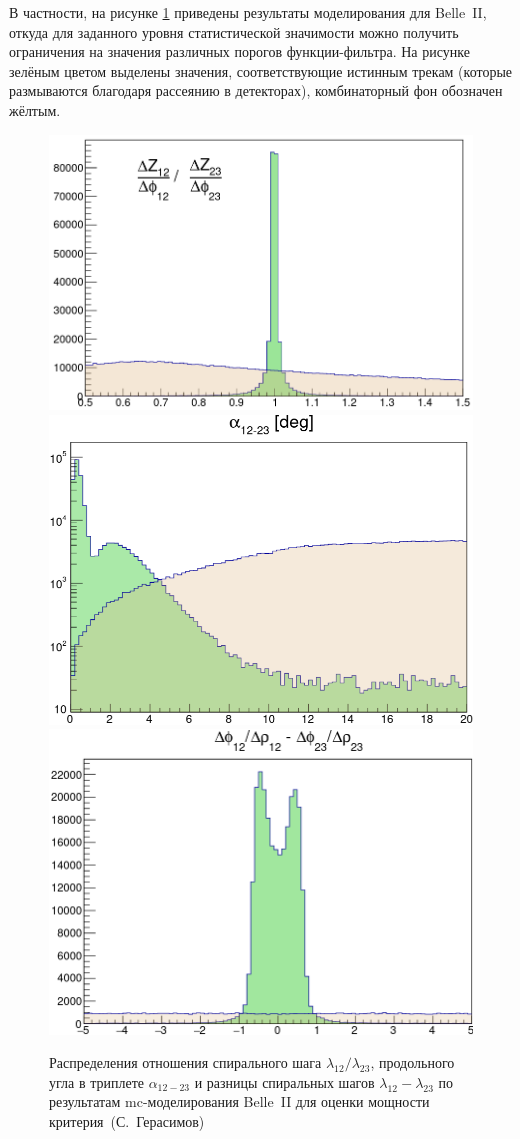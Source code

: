 В частности, на рисунке \ref{fig:belle-ii-catsc} приведены результаты моделирования
для Belle~II, откуда для заданного уровня статистической значимости можно получить
ограничения на значения различных порогов функции-фильтра. На рисунке зелёным цветом
выделены значения, соответствующие истинным трекам (которые размываются благодаря
рассеянию в детекторах), комбинаторный фон обозначен жёлтым.

\begin{figure}
    \centering
    \includegraphics[width=0.32\linewidth]{images//illustrative/pitch-ratios.png}
    \includegraphics[width=0.32\linewidth]{images//illustrative/belle-ii-catsc-opening-angle.png}
    \includegraphics[width=0.32\linewidth]{images//illustrative/belle-ii-catsc-pitch-delta.png}
    \caption{Распределения отношения спирального шага $\lambda_{12}/\lambda_{23}$,
    продольного угла в триплете $\alpha_{12-23}$ и разницы спиральных шагов
    $\lambda_{12} - \lambda_{23}$ по результатам \acrshort{mc}-моделирования
    Belle~II для оценки мощности критерия~(С.~Герасимов)}
    \label{fig:belle-ii-catsc}
\end{figure}

